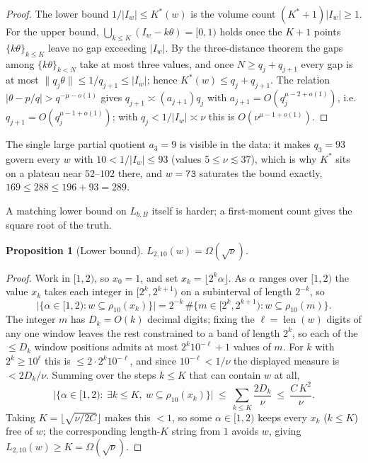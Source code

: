 \documentclass[a4paper]{article}
\theoremstyle{plain}
\newtheorem{proposition}{Proposition}[subsection]
\theoremstyle{definition}
\theoremstyle{remark}
\DeclareMathOperator{\len}{len}
\newcommand{\Lbb}[1][b,B]{L_{#1}}
\begin{document}
\begin{proof}
The lower bound $1/|I_w|\le K^{*}(w)$ is the volume count $(K^{*}+1)|I_w|\ge1$. For the upper bound, $\bigcup_{k\le K}(I_w-k\theta)=[0,1)$ holds once the $K+1$ points $\{k\theta\}_{k\le K}$ leave no gap exceeding $|I_w|$. By the three-distance theorem the gaps among $\{k\theta\}_{k<N}$ take at most three values, and once $N\ge q_j+q_{j+1}$ every gap is at most $\lVert q_j\theta\rVert\le1/q_{j+1}\le|I_w|$; hence $K^{*}(w)\le q_j+q_{j+1}$. The relation $|\theta-p/q|>q^{-\mu-o(1)}$ gives $q_{j+1}\asymp(a_{j+1})q_j$ with $a_{j+1}=O(q_j^{\mu-2+o(1)})$, i.e.\ $q_{j+1}=O(q_j^{\mu-1+o(1)})$; with $q_j<1/|I_w|\asymp\nu$ this is $O(\nu^{\mu-1+o(1)})$.
\end{proof}

The single large partial quotient $a_3=9$ is visible in the data: it makes $q_3=93$ govern every $w$ with $10<1/|I_w|\le93$ (values $5\le\nu\lesssim37$), which is why $K^{*}$ sits on a plateau near $52$--$102$ there, and $w=\texttt{73}$ saturates the bound exactly, $169\le288\le196+93=289$.

A matching lower bound on $\Lbb$ itself is harder; a first-moment count gives the square root of the truth.

\begin{proposition}[Lower bound]\label{av:prop:lower}
$\Lbb[2,10](w)=\Omega(\sqrt{\nu})$.
\end{proposition}

\begin{proof}
Work in $[1,2)$, so $x_0=1$, and set $x_k=\lfloor2^{k}\alpha\rfloor$. As $\alpha$ ranges over $[1,2)$ the value $x_k$ takes each integer in $[2^{k},2^{k+1})$ on a subinterval of length $2^{-k}$, so
\[
\bigl|\{\alpha\in[1,2): w\subseteq\rho_{10}(x_k)\}\bigr|=2^{-k}\,\#\{m\in[2^{k},2^{k+1}):w\subseteq\rho_{10}(m)\}.
\]
The integer $m$ has $D_k=O(k)$ decimal digits; fixing the $\ell=\len(w)$ digits of any one window leaves the rest constrained to a band of length $2^{k}$, so each of the $\le D_k$ window positions admits at most $2^{k}10^{-\ell}+1$ values of $m$. For $k$ with $2^{k}\ge10^{\ell}$ this is $\le2\cdot2^{k}10^{-\ell}$, and since $10^{-\ell}<1/\nu$ the displayed measure is $<2D_k/\nu$. Summing over the steps $k\le K$ that can contain $w$ at all,
\[
\bigl|\{\alpha\in[1,2):\ \exists k\le K,\ w\subseteq\rho_{10}(x_k)\}\bigr|\ \le\ \sum_{k\le K}\frac{2D_k}{\nu}\ \le\ \frac{C\,K^{2}}{\nu}.
\]
Taking $K=\lfloor\sqrt{\nu/2C}\rfloor$ makes this $<1$, so some $\alpha\in[1,2)$ keeps every $x_k$ ($k\le K$) free of $w$; the corresponding length-$K$ string from $1$ avoids $w$, giving $\Lbb[2,10](w)\ge K=\Omega(\sqrt\nu)$.
\end{proof}
\end{document}
